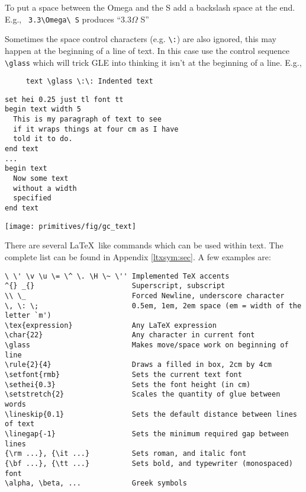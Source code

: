 \begin{commanddescription}
To put a space between the Omega and the S add a
backslash space at the end. E.g.,  \verb+ 3.3\Omega\ S+
produces ``3.3$\Omega$ S''

Sometimes the space control characters (e.g. \verb+\:+)
are also ignored, this may
happen at the beginning of a line of text. In this case use the
control sequence \verb+\glass+ which will trick GLE into
thinking it isn't at the beginning of a line. E.g.,

\preglecode{}
\begin{Verbatim}
     text \glass \:\: Indented text
\end{Verbatim}
\postglecode{}

\begin{minipage}[c]{8cm}
\begin{Verbatim}
set hei 0.25 just tl font tt
begin text width 5
  This is my paragraph of text to see
  if it wraps things at four cm as I have
  told it to do.
end text
...
begin text
  Now some text
  without a width
  specified
end text
\end{Verbatim}
\end{minipage}
\hfill
\begin{minipage}[c]{7cm}
\mbox{\texttt{[image: primitives/fig/gc\_text]}}
\end{minipage}

  
  
  
  
 \index{\LaTeX} There are several \LaTeX \ like commands which can be used within text. The complete list can be found in Appendix \ref{ltxsym:sec}. A few examples are:

\begin{Verbatim}
\ \' \v \u \= \^ \. \H \~ \'' Implemented TeX accents
^{} _{}                       Superscript, subscript
\\ \_                         Forced Newline, underscore character
\, \: \;                      0.5em, 1em, 2em space (em = width of the letter `m')
\tex{expression}              Any LaTeX expression
\char{22}                     Any character in current font
\glass                        Makes move/space work on beginning of line
\rule{2}{4}                   Draws a filled in box, 2cm by 4cm
\setfont{rmb}                 Sets the current text font
\sethei{0.3}                  Sets the font height (in cm)
\setstretch{2}                Scales the quantity of glue between words
\lineskip{0.1}                Sets the default distance between lines of text
\linegap{-1}                  Sets the minimum required gap between lines
{\rm ...}, {\it ...}          Sets roman, and italic font
{\bf ...}, {\tt ...}          Sets bold, and typewriter (monospaced) font
\alpha, \beta, ...            Greek symbols
\end{Verbatim}


\end{commanddescription}
